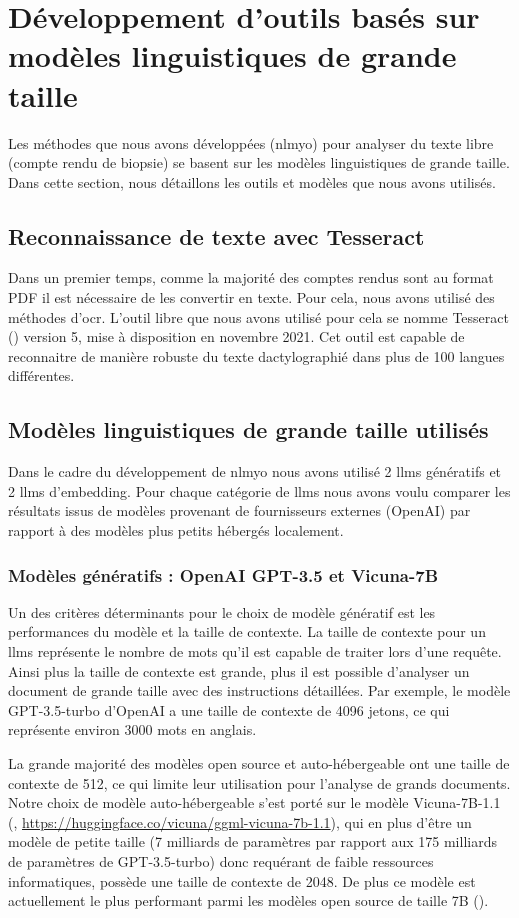 \section{Développement d'outils basés sur modèles linguistiques de grande taille}
Les méthodes que nous avons développées (\gls{nlmyo}) pour analyser du texte libre (compte rendu de biopsie) se basent sur les modèles linguistiques de grande taille. Dans cette section, nous détaillons les outils et modèles que nous avons utilisés.

\subsection{Reconnaissance de texte avec Tesseract}
Dans un premier temps, comme la majorité des comptes rendus sont au format PDF il est nécessaire de les convertir en texte. Pour cela, nous avons utilisé des méthodes d'\gls{ocr}. L'outil libre que nous avons utilisé pour cela se nomme Tesseract (\cite{ray_tesseract_2015}) version 5, mise à disposition en novembre 2021. Cet outil est capable de reconnaitre de manière robuste du texte dactylographié dans plus de 100 langues différentes.

\subsection{Modèles linguistiques de grande taille utilisés}
Dans le cadre du développement de \gls{nlmyo} nous avons utilisé 2 \gls{llms} génératifs et 2 \gls{llms} d'embedding. Pour chaque catégorie de \gls{llms} nous avons voulu comparer les résultats issus de modèles provenant de fournisseurs externes (OpenAI) par rapport à des modèles plus petits hébergés localement.

\subsubsection{Modèles génératifs : OpenAI GPT-3.5 et Vicuna-7B}
Un des critères déterminants pour le choix de modèle génératif est les performances du modèle et la taille de contexte. La taille de contexte pour un \gls{llms} représente le nombre de mots qu'il est capable de traiter lors d'une requête. Ainsi plus la taille de contexte est grande, plus il est possible d'analyser un document de grande taille avec des instructions détaillées. Par exemple, le modèle GPT-3.5-turbo d'OpenAI a une taille de contexte de 4096 jetons, ce qui représente environ 3000 mots en anglais. 

La grande majorité des modèles open source et auto-hébergeable ont une taille de contexte de 512, ce qui limite leur utilisation pour l'analyse de grands documents. Notre choix de modèle auto-hébergeable s'est porté sur le modèle Vicuna-7B-1.1 (\cite{chiang_vicuna_2023}, \url{https://huggingface.co/vicuna/ggml-vicuna-7b-1.1}), qui en plus d'être un modèle de petite taille (7 milliards de paramètres par rapport aux 175 milliards de paramètres de GPT-3.5-turbo) donc requérant de faible ressources informatiques, possède une taille de contexte de 2048. De plus ce modèle est actuellement le plus performant parmi les modèles open source de taille 7B (\cite{hendrycks_measuring_2021}). 

